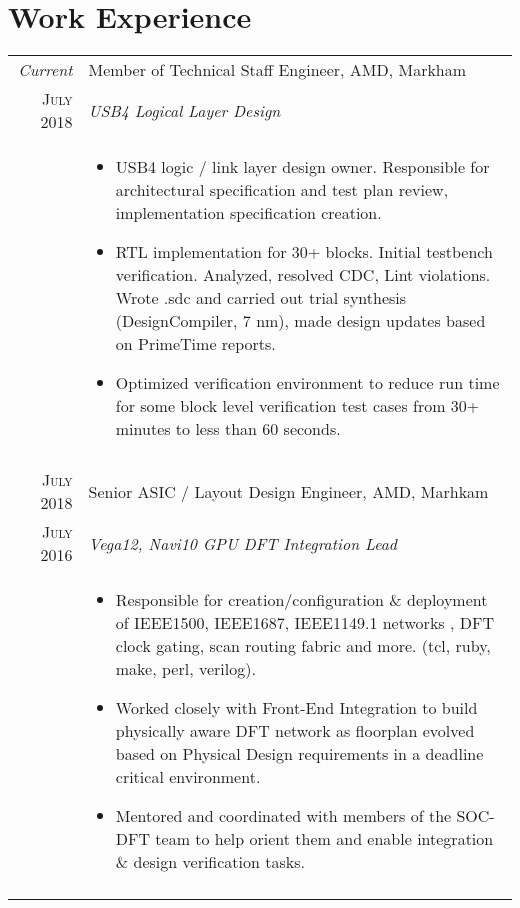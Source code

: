 \documentclass[a4paper,10pt]{article}
\begin{document}
\section{Work Experience}
\begin{longtable}{r|p{15cm}}
 \emph{Current} & Member of Technical Staff Engineer, \textsc{AMD}, Markham 
\\\textsc{July 2018}&\emph{USB4 Logical Layer Design}\\&\footnotesize{

\begin{itemize}\vspace*{-\baselineskip}
  \item USB4 logic / link layer design owner. Responsible for architectural specification and test plan review, implementation specification creation.
  \item RTL implementation for 30+ blocks. Initial testbench verification. Analyzed, resolved CDC, Lint violations. Wrote .sdc and carried out trial synthesis (DesignCompiler, 7 nm), made design updates based on PrimeTime reports. 
  \item Optimized verification environment to reduce run time for some block level verification test cases from 30+ minutes to less than 60 seconds. 
\end{itemize}\vspace*{-\baselineskip}\vspace*{-\baselineskip}

}\\\multicolumn{2}{c}{} \\

 \textsc{July 2018} & Senior ASIC / Layout Design Engineer, \textsc{AMD}, Marhkam 
\\\textsc{July 2016}&\emph{Vega12, Navi10 GPU DFT Integration Lead}\\&\footnotesize{
\begin{itemize}\vspace*{-\baselineskip}
  \item Responsible for creation/configuration \& deployment of IEEE1500, IEEE1687, IEEE1149.1 networks , DFT clock gating, scan routing fabric and more. (tcl, ruby, make, perl, verilog).
  \item Worked closely with Front-End Integration to build physically aware DFT network as floorplan evolved based on Physical Design requirements in a deadline critical environment.
  \item Mentored and coordinated with members of the SOC-DFT team to help orient them and enable integration \& design verification tasks. 
\end{itemize}\vspace*{-\baselineskip}\vspace*{-\baselineskip}
}\\\multicolumn{2}{c}{} \\


\end{longtable}
\end{document}

